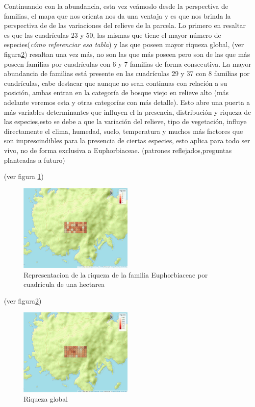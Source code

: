 \documentclass[11pt,]{article}
\begin{document}
Continuando con la abundancia, esta vez veámoslo desde la perspectiva de
familias, el mapa que nos orienta nos da una ventaja y es que nos brinda
la perspectiva de de las variaciones del relieve de la parcela. Lo
primero en resaltar es que las cuadrículas 23 y 50, las mismas que tiene
el mayor número de especies(\emph{cómo referenciar esa tabla}) y las que
poseen mayor riqueza global, (ver figura\ref{fig:cuadro_riqueza_global})
resaltan una vez más, no son las que más poseen pero son de las que más
poseen familias por cuadrículas con 6 y 7 familias de forma consecutiva.
La mayor abundancia de familias está presente en las cuadrículas 29 y 37
con 8 familias por cuadrículas, cabe destacar que aunque no sean
continuas con relación a su posición, ambas entran en la categoría de
bosque viejo en relieve alto (más adelante veremos esta y otras
categorías con más detalle). Esto abre una puerta a más variables
determinantes que influyen el la presencia, distribución y riqueza de
las especies,esto se debe a que la variación del relieve, tipo de
vegetación, influye directamente el clima, humedad, suelo, temperatura y
muchos más factores que son imprescindibles para la presencia de ciertas
especies, esto aplica para todo ser vivo, no de forma exclusiva a
Euphorbiaceae. (patrones reflejados,preguntas planteadas a futuro)

(ver figura \ref{fig:cuadro_de_riqueza_familia})

\begin{figure}
\centering
\includegraphics[width=0.50000\textwidth]{mapa_cuadros_riq_mi_familia.png}
\caption{\label{fig:cuadro_de_riqueza_familia}Representacion de la
riqueza de la familia Euphorbiaceae por cuadricula de una hectarea}
\end{figure}

(ver figura\ref{fig:cuadro_riqueza_global})

\begin{figure}
\centering
\includegraphics[width=0.50000\textwidth]{mapa_cuadros_riq_global.png}
\caption{\label{fig:cuadro_riqueza_global}Riqueza global}
\end{figure}
\end{document}
